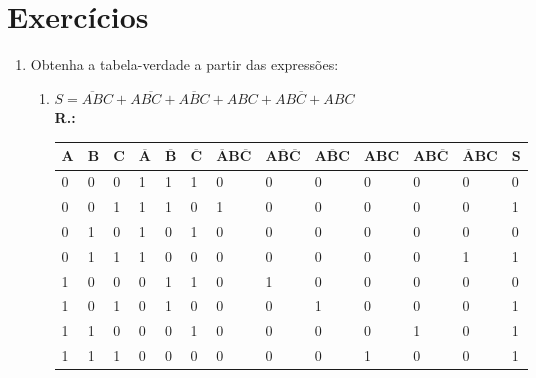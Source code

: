 \documentclass{article}[12pt]
\begin{document}
\section*{Exercícios}

\begin{enumerate}
    \item Obtenha a tabela-verdade a partir das expressões:
    \begin{enumerate}
        \item $S = \overline{AB}C + A\overline{BC} + A\overline{B}C + ABC + AB\overline{C} + ABC$ \\
        \textbf{R.:}
        \begin{center}    
            \begin{table}[h]
                \label{tab:2a}
                \begin{tabular}{|p{0.8cm}|p{0.8cm}|p{0.8cm}|p{0.8cm}|p{0.8cm}|p{0.8cm}|p{0.8cm}|p{0.8cm}|p{0.8cm}|p{0.8cm}|p{0.8cm}|p{0.8cm}|p{0.8cm}|}
                    \hline
                    \(\mathbf{A}\) & \(\mathbf{B}\) & \(\mathbf{C}\) & \(\mathbf{\overline{A}}\) & \(\mathbf{\overline{B}}\) & \(\mathbf{\overline{C}}\) & \(\mathbf{\overline{A}B\overline{C}}\) & \(\mathbf{A\overline{B}\overline{C}}\) & \(\mathbf{A\overline{B}C}\) & \(\mathbf{ABC}\) & \(\mathbf{AB\overline{C}}\) & \(\mathbf{\overline{A}BC}\) & \(\mathbf{S}\) \\ \hline
                    0 & 0 & 0 & 1 & 1 & 1 & 0 & 0 & 0 & 0 & 0 & 0 & 0 \\ \hline
                    0 & 0 & 1 & 1 & 1 & 0 & 1 & 0 & 0 & 0 & 0 & 0 & 1 \\ \hline
                    0 & 1 & 0 & 1 & 0 & 1 & 0 & 0 & 0 & 0 & 0 & 0 & 0 \\ \hline
                    0 & 1 & 1 & 1 & 0 & 0 & 0 & 0 & 0 & 0 & 0 & 1 & 1 \\ \hline
                    1 & 0 & 0 & 0 & 1 & 1 & 0 & 1 & 0 & 0 & 0 & 0 & 0 \\ \hline
                    1 & 0 & 1 & 0 & 1 & 0 & 0 & 0 & 1 & 0 & 0 & 0 & 1 \\ \hline
                    1 & 1 & 0 & 0 & 0 & 1 & 0 & 0 & 0 & 0 & 1 & 0 & 1 \\ \hline
                    1 & 1 & 1 & 0 & 0 & 0 & 0 & 0 & 0 & 1 & 0 & 0 & 1 \\ \hline
                \end{tabular}
            \end{table}
        \end{center}


\end{enumerate}
\end{enumerate}
\end{document}
